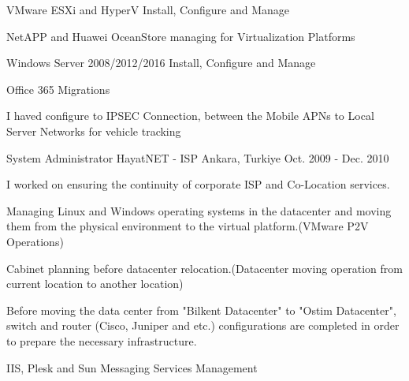 \begin{cventries}
{\begin{cvitems}
        \item {VMware ESXi and HyperV Install, Configure and Manage}
        \item {NetAPP and Huawei OceanStore managing for Virtualization Platforms}
        \item {Windows Server 2008/2012/2016 Install, Configure and Manage}
        \item {Office 365 Migrations}
        \item {I haved configure to IPSEC Connection, between the Mobile APNs to Local Server Networks for vehicle tracking}
      \end{cvitems} 
    }

\cventry
    {System Administrator} %
    {HayatNET - ISP} %
    {Ankara, Turkiye} %
    {Oct. 2009 - Dec. 2010} %
    {
      \begin{cvitems} %
        \item {I worked on ensuring the continuity of corporate ISP and Co-Location services.}
        \item {Managing Linux and Windows operating systems in the datacenter and moving them from the physical environment to the virtual platform.(VMware P2V Operations)}
        \item {Cabinet planning before datacenter relocation.(Datacenter moving operation from current location to another location)}
        \item {Before moving the data center from "Bilkent Datacenter" to "Ostim Datacenter", switch and router (Cisco, Juniper and etc.) configurations are completed in order to prepare the necessary infrastructure.}
        \item {IIS, Plesk and Sun Messaging Services Management}
        \end{cvitems} 
    }


\end{cventries}
